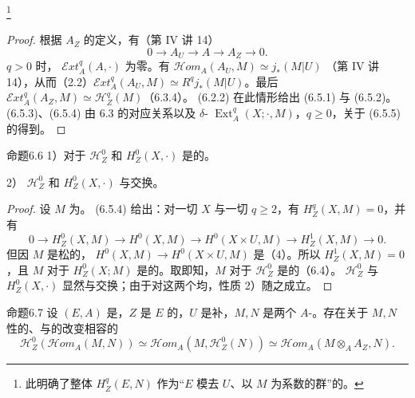 \footnote{此明确了整体 $H_Z^q(E,N)$ 作为“$E$ 模去 $U$、以 $M$ 为系数的群”的。}
\begin{proof}根据 $A_Z$ 的定义，有（第 IV 讲 14）
\begin{equation}0\to A_U\to A\to A_Z\to0.\tag{6.5.5}\end{equation}
$q>0$ 时， $\mathscr Ext_A^q(A,\cdot)$ 为零。有 $\mathscr Hom_A(A_U,M)\simeq j_*(M|U)$
（第 IV 讲 14），从而（2.2）$\mathscr Ext_A^q(A_U,M)\simeq R^qj_*(M|U)$。最后 $\mathscr Ext_A^q(A_Z,M)\simeq\mathscr H_Z^q(M)$（6.3.4）。 (6.2.2) 在此情形给出 (6.5.1) 与 (6.5.2)。 (6.5.3)、(6.5.4) 由 6.3 的对应关系以及 $\delta$- $\operatorname{Ext}_A^q(X;\cdot,M)$，$q\geq0$，关于 (6.5.5) 的得到。\end{proof}
\begin{SGAresult}{命题}{6.6}
1）对于 $\mathscr H_Z^0$ 和 $H_Z^0(X,\cdot)$ 是的。

2） $\mathscr H_Z^0$ 和 $H_Z^0(X,\cdot)$ 与交换。
\end{SGAresult}
\begin{proof}
设 $M$ 为。 (6.5.4) 给出：对一切 $X$ 与一切 $q\geq2$，有 $H_Z^q(X,M)=0$，并有
\[0\to H_Z^0(X,M)\to H^0(X,M)\to H^0(X\times U,M)\to H_Z^1(X,M)\to0.\]
但因 $M$ 是松的， $H^0(X,M)\to H^0(X\times U,M)$ 是（4）。所以 $H_Z^1(X,M)=0$，且 $M$ 对于 $H_Z^0(X;M)$ 是的。取即知，$M$ 对于 $\mathscr H_Z^0$ 是的（6.4）。 $\mathscr H_Z^0$ 与 $H_Z^0(X,\cdot)$ 显然与交换；由于对这两个均，性质 2）随之成立。
\end{proof}
\begin{SGAresult}{命题}{6.7}
设 $(E,A)$ 是，$Z$ 是 $E$ 的，$U$ 是补，$M,N$ 是两个 $A$-。存在关于 $M,N$ 性的、与的改变相容的
\[\mathscr H_Z^0(\mathscr Hom_A(M,N))\simeq\mathscr Hom_A(M,\mathscr H_Z^0(N))\simeq\mathscr Hom_A(M\otimes_A A_Z,N).\]
\end{SGAresult}
